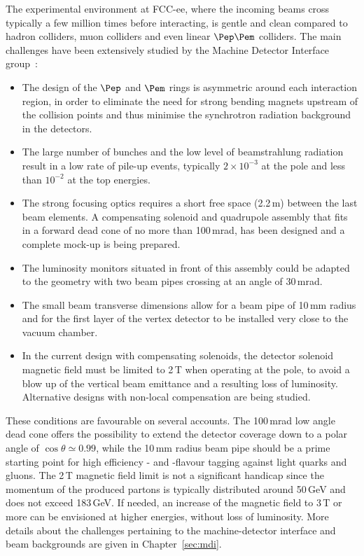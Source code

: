 The experimental environment at FCC-ee, where the incoming beams cross typically a few million times before interacting, is gentle and clean compared to hadron colliders, muon colliders and even linear $\Pep\Pem$ colliders. 
The main challenges have been extensively studied by the Machine Detector Interface group~\cite{Boscolo:2019awb}:
\begin{itemize}
    \item The design of the $\Pep$ and $\Pem$ rings is asymmetric around each interaction region, in order to eliminate the need for strong bending magnets upstream of the collision points and thus minimise the synchrotron radiation background in the detectors.
    \item The large number of bunches and the low level of beamstrahlung radiation result in a low rate of pile-up events, typically $2\times 10^{-3}$ at the \PZ pole and less than $10^{-2}$ at the top energies.
    \item The strong focusing optics requires a short free space (2.2\,m) between the last beam elements. 
    A compensating solenoid and quadrupole assembly that fits in a forward dead cone of no more than 100\,mrad, has been designed and a complete mock-up is being prepared.   
    \item The luminosity monitors situated in front of this assembly could be adapted to the geometry with two beam pipes crossing at an angle of 30\,mrad.
    \item The small beam transverse dimensions allow for a beam pipe of 10\,mm radius and for the first layer of the vertex detector to be installed very close to the vacuum chamber.
    \item In the current design with compensating solenoids, the detector solenoid magnetic field must be limited to 2\,T when operating at the \PZ pole, to avoid a blow up of the vertical beam emittance and a resulting loss of luminosity. 
    Alternative designs with non-local compensation are being studied.  
\end{itemize}

These conditions are favourable on several accounts. 
The 100\,mrad low angle dead cone offers the possibility to extend the detector coverage down to a polar angle of $\cos{\theta}\simeq 0.99$, while the 10\,mm radius beam pipe should be a prime starting point for high efficiency \PQb- and \PQc-flavour tagging against light quarks and gluons. 
The 2\,T magnetic field limit is not a significant handicap since the momentum of the produced partons is typically distributed around 50\,GeV and does not exceed 183\,GeV. 
If needed, an increase of the magnetic field to 3\,T or more can be envisioned at higher energies, without loss of luminosity. 
More details about the challenges pertaining to the machine-detector interface and beam backgrounds are given in Chapter~\ref{sec:mdi}.


